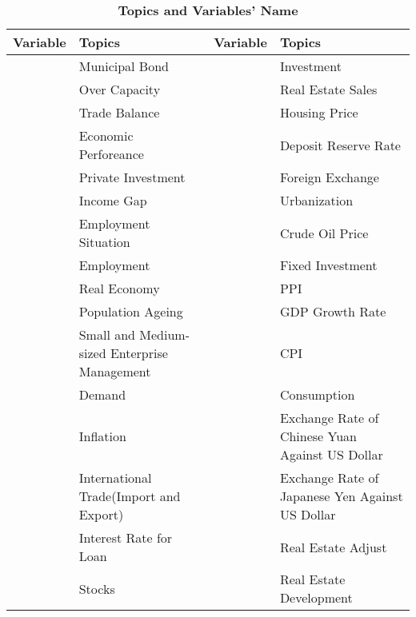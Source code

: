 \documentclass[10pt]{article}
\begin{document}
	\begin{table}[ht!]
	\begin{center}
	\caption{\label{Topics1}\bf{Topics and Variables' Name}}
	\begin{tabular}{cp{5.5cm}|cp{5.5cm}}

\hline							
Variable	&	Topics	                                                                  &	Variable	&	Topics	\\
\hline							
	&	Municipal Bond	                                                          &		&	Investment	\\
	&	Over Capacity	                                                          &		&	Real Estate Sales	\\
	&	Trade Balance	                                                          &		&	Housing Price	\\
	&	Economic Perforeance                                               &		&	Deposit Reserve Rate	\\
       &	Private Investment	                                                  &		&	Foreign Exchange	\\
	&	Income Gap	                                                           &		&	Urbanization	\\
	&	Employment Situation	                                          &		&	Crude Oil Price	\\
	&	Employment	                                                           &	   &	Fixed Investment	\\
	&	Real Economy	                                                           &		&	PPI	\\
	&	Population Ageing	                                                   &		&	GDP Growth Rate	\\
	&	Small and Medium-sized Enterprise Management	&		&	CPI	\\
	&	Demand	                                                                    &		&	Consumption	\\
	&	Inflation	                                                                    &		&	Exchange Rate of Chinese Yuan Against US Dollar 	\\
	&	International Trade(Import and Export)	                  &		&	Exchange Rate of Japanese Yen Against US Dollar 	\\
	&	Interest Rate for Loan                                                  &     	&	Real Estate Adjust	\\
	&	Stocks	                                                                    &		&	Real Estate Development	\\

\end{tabular}
\end{center}
\end{table}
\end{document}
